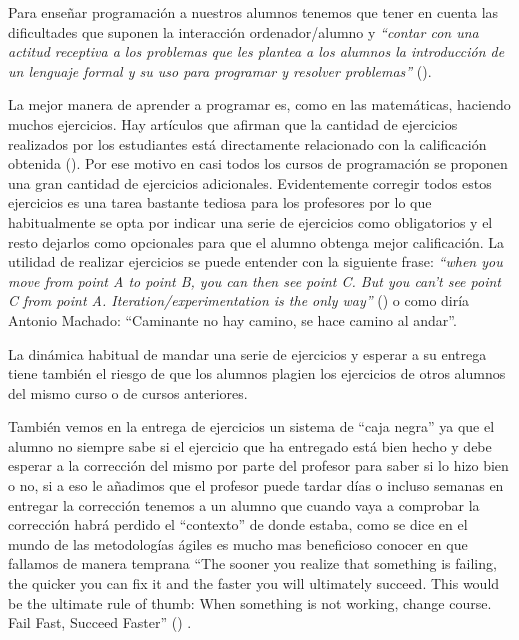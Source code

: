 \bigskip
Para enseñar programación a nuestros alumnos tenemos que tener en cuenta las dificultades que suponen la interacción ordenador/alumno y \textit{``contar con una actitud receptiva a los problemas que les plantea a los alumnos la introducción de un lenguaje formal y su uso para programar y resolver problemas''} (\cite{vitale_psycopedagogical_1990}).

\bigskip
La mejor manera de aprender a programar es, como en las matemáticas, haciendo muchos ejercicios. Hay artículos que afirman que la cantidad de ejercicios realizados por los estudiantes  está directamente relacionado con la calificación obtenida (\cite{qian_teachers_2019}). Por ese motivo en casi todos los cursos de programación se proponen una gran cantidad de ejercicios adicionales. Evidentemente corregir todos estos ejercicios es una tarea bastante tediosa para los profesores por lo que habitualmente se opta por indicar una serie de ejercicios como obligatorios y el resto dejarlos como opcionales para que el alumno obtenga mejor calificación. La utilidad de realizar ejercicios se puede entender con la siguiente frase: \textit{``when you move from point A to point B, you can then see point C. But you can’t see point C from point A. Iteration/experimentation is the only way''} (\cite{ismail_exponential_2018}) o como diría Antonio Machado: ``Caminante no hay camino, se hace camino al andar''.

\bigskip
La dinámica habitual de mandar una serie de ejercicios y esperar a su entrega tiene también el riesgo de que los alumnos plagien los ejercicios de otros alumnos del mismo curso o de cursos anteriores.

\bigskip
También vemos en la entrega de ejercicios un sistema de ``caja negra'' ya que el alumno no siempre sabe si el ejercicio que ha entregado está bien hecho y debe esperar a la corrección del mismo por parte del profesor para saber si lo hizo bien o no, si a eso le añadimos que el profesor puede tardar días o incluso semanas en entregar la corrección tenemos a un alumno que cuando vaya a comprobar la corrección habrá perdido el ``contexto'' de donde estaba, como se dice en el mundo de las metodologías ágiles es mucho mas beneficioso conocer en que fallamos de manera temprana ``The sooner you realize that something is failing, the quicker you can fix it and the faster you will ultimately succeed. This would be the ultimate rule of thumb: When something is not working, change course. Fail Fast, Succeed Faster'' (\cite{godse_fail_2013}) .

